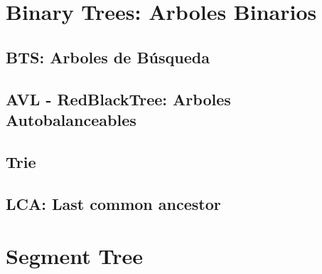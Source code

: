 \documentclass[12pt, fleqn]{report}                             %
\theoremstyle{break}                                            %
\begin{document}
    \chapter{Binary Trees: Arboles Binarios}

        \section{BTS: Arboles de Búsqueda}

        \section{AVL - RedBlackTree: Arboles Autobalanceables}

        \section{Trie}

        \section{LCA: Last common ancestor}

    
    \clearpage
    \chapter{Segment Tree}

\end{document}

